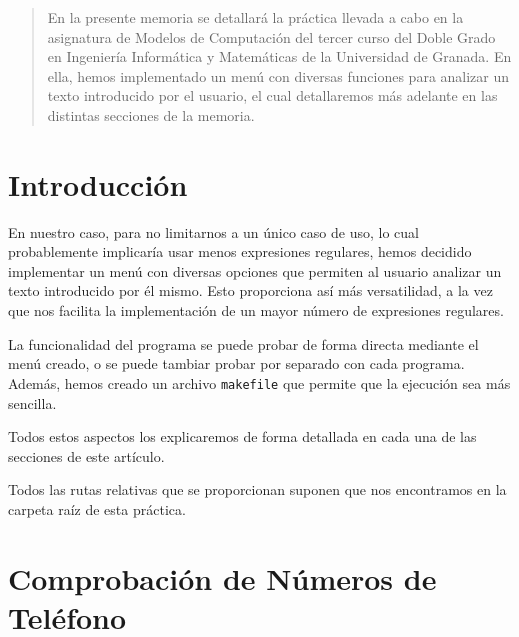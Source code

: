 \documentclass[12pt]{article}
\begin{document}

    
    


    \begin{abstract}
        En la presente memoria se detallará la práctica llevada a cabo en la asignatura de Modelos de Computación del tercer curso del Doble Grado en Ingeniería Informática y Matemáticas de la Universidad de Granada.
        En ella, hemos implementado un menú con diversas funciones para analizar un texto introducido por el usuario, el cual detallaremos más adelante en las distintas secciones de la memoria.
    \end{abstract}

    \newpage
    \section{Introducción}

    En nuestro caso, para no limitarnos a un único caso de uso, lo cual probablemente implicaría usar menos expresiones regulares, hemos decidido implementar un menú con diversas opciones que permiten al usuario analizar un texto introducido por él mismo. Esto proporciona así más versatilidad, a la vez que nos facilita la implementación de un mayor número de expresiones regulares.

    La funcionalidad del programa se puede probar de forma directa mediante el menú creado, o se puede tambiar probar por separado con cada programa. Además, hemos creado un archivo \verb|makefile| que permite que la ejecución sea más sencilla.

    Todos estos aspectos los explicaremos de forma detallada en cada una de las secciones de este artículo.

    \begin{observacion}
    Todos las rutas relativas que se proporcionan suponen que nos encontramos en la carpeta raíz de esta práctica.
    \end{observacion}

    \section{Comprobación de Números de Teléfono}
\end{document}
